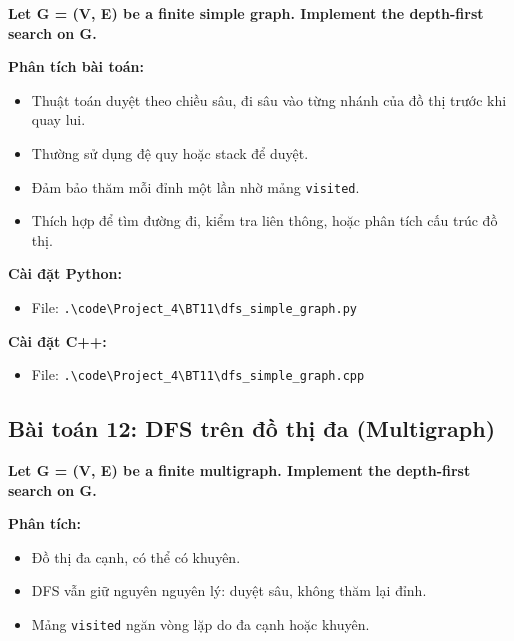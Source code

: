 \documentclass[12pt,a4paper]{article}
\begin{document}
\begin{problembox}
    \textbf{Let G = (V, E) be a finite simple graph. Implement the depth-first search on G.} 
\end{problembox}

\textbf{Phân tích bài toán:}
\begin{itemize}[label=\textbullet]
    \item Thuật toán duyệt theo chiều sâu, đi sâu vào từng nhánh của đồ thị trước khi quay lui.
    \item Thường sử dụng đệ quy hoặc stack để duyệt.
    \item Đảm bảo thăm mỗi đỉnh một lần nhờ mảng \texttt{visited}.
    \item Thích hợp để tìm đường đi, kiểm tra liên thông, hoặc phân tích cấu trúc đồ thị.
\end{itemize}

\textbf{Cài đặt Python:}
\begin{itemize}[label=\textbullet]
   \item File: \texttt{.\textbackslash code\textbackslash Project\_4\textbackslash BT11\textbackslash dfs\_simple\_graph.py}
\end{itemize}

\textbf{Cài đặt C++:}
\begin{itemize}[label=\textbullet]
   \item File: \texttt{.\textbackslash code\textbackslash Project\_4\textbackslash BT11\textbackslash dfs\_simple\_graph.cpp}
\end{itemize}



\subsection{Bài toán 12: DFS trên đồ thị đa (Multigraph)}

\begin{problembox}
    \textbf{Let G = (V, E) be a finite multigraph. Implement the depth-first search on G.} 
\end{problembox}

\textbf{Phân tích:}
\begin{itemize}[label=\textbullet]
    \item Đồ thị đa cạnh, có thể có khuyên.
    \item DFS vẫn giữ nguyên nguyên lý: duyệt sâu, không thăm lại đỉnh.
    \item Mảng \texttt{visited} ngăn vòng lặp do đa cạnh hoặc khuyên.
\end{itemize}
\end{document}

